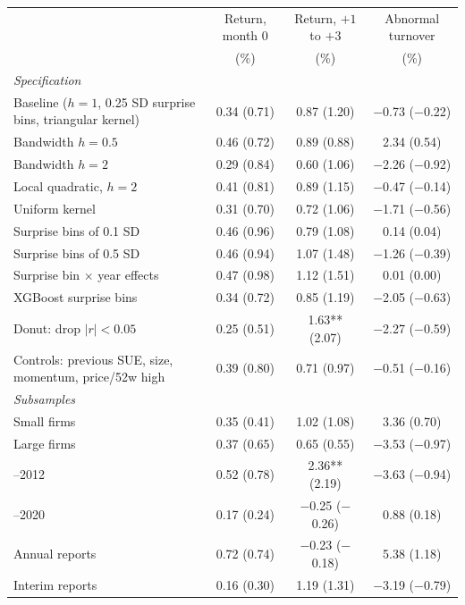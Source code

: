 \begin{tabular}{lccc}
\toprule
 & Return, month 0 & Return, $+1$ to $+3$ & Abnormal turnover\\
 & (\%) & (\%) & (\%)\\
\midrule
\multicolumn{4}{l}{\textit{Specification}}\\
\quad Baseline ($h=1$, 0.25 SD surprise bins, triangular kernel) & 0.34 (0.71) & 0.87 (1.20) & \ensuremath{-}0.73 (\ensuremath{-}0.22)\\
\quad Bandwidth $h=0.5$ & 0.46 (0.72) & 0.89 (0.88) & 2.34 (0.54)\\
\quad Bandwidth $h=2$ & 0.29 (0.84) & 0.60 (1.06) & \ensuremath{-}2.26 (\ensuremath{-}0.92)\\
\quad Local quadratic, $h=2$ & 0.41 (0.81) & 0.89 (1.15) & \ensuremath{-}0.47 (\ensuremath{-}0.14)\\
\quad Uniform kernel & 0.31 (0.70) & 0.72 (1.06) & \ensuremath{-}1.71 (\ensuremath{-}0.56)\\
\quad Surprise bins of 0.1 SD & 0.46 (0.96) & 0.79 (1.08) & 0.14 (0.04)\\
\quad Surprise bins of 0.5 SD & 0.46 (0.94) & 1.07 (1.48) & \ensuremath{-}1.26 (\ensuremath{-}0.39)\\
\quad Surprise bin $\times$ year effects & 0.47 (0.98) & 1.12 (1.51) & 0.01 (0.00)\\
\quad XGBoost surprise bins & 0.34 (0.72) & 0.85 (1.19) & \ensuremath{-}2.05 (\ensuremath{-}0.63)\\
\quad Donut: drop $|r|<0.05$ & 0.25 (0.51) & 1.63** (2.07) & \ensuremath{-}2.27 (\ensuremath{-}0.59)\\
\quad Controls: previous SUE, size, momentum, price/52w high & 0.39 (0.80) & 0.71 (0.97) & \ensuremath{-}0.51 (\ensuremath{-}0.16)\\
\multicolumn{4}{l}{\textit{Subsamples}}\\
\quad Small firms & 0.35 (0.41) & 1.02 (1.08) & 3.36 (0.70)\\
\quad Large firms & 0.37 (0.65) & 0.65 (0.55) & \ensuremath{-}3.53 (\ensuremath{-}0.97)\\
\quad 2005--2012 & 0.52 (0.78) & 2.36** (2.19) & \ensuremath{-}3.63 (\ensuremath{-}0.94)\\
\quad 2013--2020 & 0.17 (0.24) & \ensuremath{-}0.25 (\ensuremath{-}0.26) & 0.88 (0.18)\\
\quad Annual reports & 0.72 (0.74) & \ensuremath{-}0.23 (\ensuremath{-}0.18) & 5.38 (1.18)\\
\quad Interim reports & 0.16 (0.30) & 1.19 (1.31) & \ensuremath{-}3.19 (\ensuremath{-}0.79)\\

\end{tabular}
